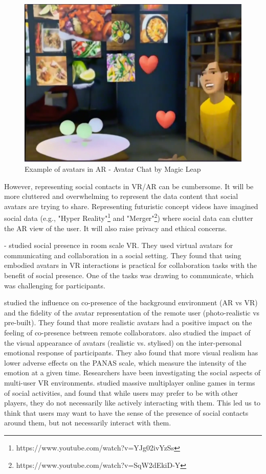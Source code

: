 \begin{figure}
    \centering
    \includegraphics[width=0.8\linewidth]{images/avatar-chat-1.png}
    \caption{Example of avatars in AR - Avatar Chat by Magic Leap}
    \label{fig:ml-avatar-chat}
\end{figure}

However, representing social contacts in VR/AR can be cumbersome. It will be more cluttered and overwhelming to represent the data content that social avatars are trying to share. Representing futuristic concept videos have imagined social data (e.g., "Hyper Reality"\footnote{https://www.youtube.com/watch?v=YJg02ivYzSs} and "Merger"\footnote{https://www.youtube.com/watch?v=SqW2dEkiD-Y}) where social data can clutter the AR view of the user. It will also raise privacy and ethical concerns.

\textcite{Greenwald2017} - studied social presence in room scale VR. They used virtual avatars for communicating and collaboration in a social setting. They found that using embodied avatars in VR interactions is practical for collaboration tasks with the benefit of social presence. One of the tasks was drawing to communicate, which was challenging for participants. 

\textcite{Jo2016} studied the influence on co-presence of the background environment (AR vs VR) and the fidelity of the avatar representation of the remote user (photo-realistic vs pre-built). They found that more realistic avatars had a positive impact on the feeling of co-presence between remote collaborators. \textcite{Volante2016} also studied the impact of the visual appearance of avatars (realistic vs. stylised) on the inter-personal emotional response of participants. They also found that more visual realism has lower adverse effects on the PANAS scale, which measure the intensity of the emotion at a given time. Researchers have been investigating the social aspects of multi-user VR environments. \textcite{Ducheneaut2006} studied massive multiplayer online games in terms of social activities, and found that while users may prefer to be with other players, they do not necessarily like actively interacting with them. This led us to think that users may want to have the sense of the presence of social contacts around them, but not necessarily interact with them.

